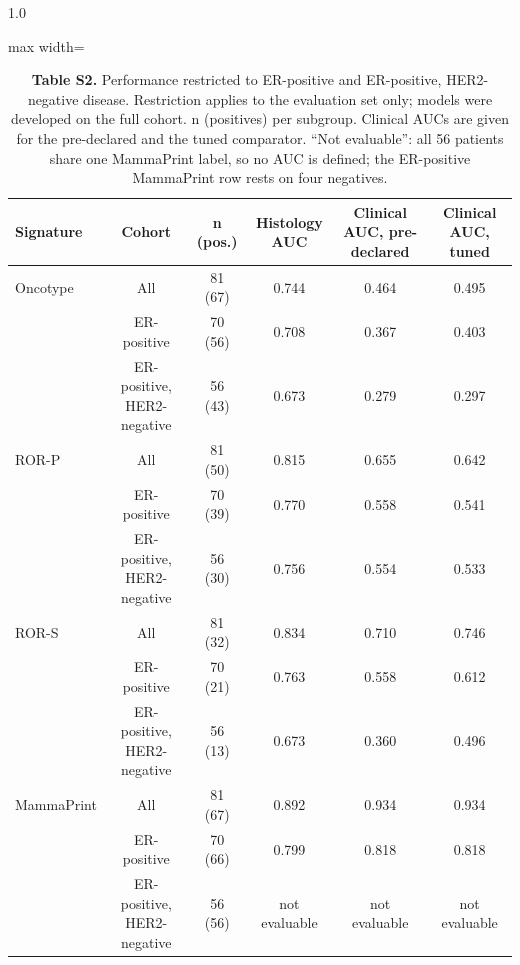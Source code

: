 \documentclass[11pt,a4paper]{article}
\begin{document}
\begin{spacing}{1.0}
\begin{table}[htbp]\centering\footnotesize
\caption*{\textbf{Table S2.} Performance restricted to ER-positive and ER-positive, HER2-negative disease. Restriction applies to the evaluation set only; models were developed on the full cohort. n (positives) per subgroup. Clinical AUCs are given for the pre-declared and the tuned comparator. ``Not evaluable'': all 56 patients share one MammaPrint label, so no AUC is defined; the ER-positive MammaPrint row rests on four negatives.}
\begin{adjustbox}{max width=\textwidth}
\begin{tabular}{@{}lccccc@{}}
\toprule
\textbf{Signature} & \textbf{Cohort} & \textbf{n (pos.)} & \textbf{Histology AUC} & \textbf{Clinical AUC, pre-declared} & \textbf{Clinical AUC, tuned} \\
\midrule
Oncotype & All & 81 (67) & 0.744 & 0.464 & 0.495 \\
 & ER-positive & 70 (56) & 0.708 & 0.367 & 0.403 \\
 & ER-positive, HER2-negative & 56 (43) & 0.673 & 0.279 & 0.297 \\
ROR-P & All & 81 (50) & 0.815 & 0.655 & 0.642 \\
 & ER-positive & 70 (39) & 0.770 & 0.558 & 0.541 \\
 & ER-positive, HER2-negative & 56 (30) & 0.756 & 0.554 & 0.533 \\
ROR-S & All & 81 (32) & 0.834 & 0.710 & 0.746 \\
 & ER-positive & 70 (21) & 0.763 & 0.558 & 0.612 \\
 & ER-positive, HER2-negative & 56 (13) & 0.673 & 0.360 & 0.496 \\
MammaPrint & All & 81 (67) & 0.892 & 0.934 & 0.934 \\
 & ER-positive & 70 (66) & 0.799 & 0.818 & 0.818 \\
 & ER-positive, HER2-negative & 56 (56) & not evaluable & not evaluable & not evaluable \\
\bottomrule
\end{tabular}
\end{adjustbox}\end{table}


\end{spacing}
\end{document}
